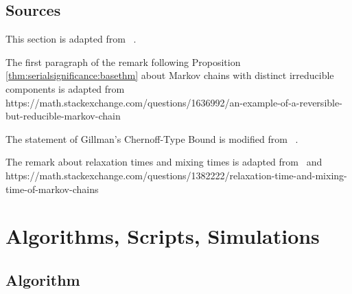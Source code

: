 \documentclass[12pt]{article}
\begin{document}
\subsection*{Sources} This section is adapted from~%
\cite{doi:10.1080/2330443X.2020.1806763, Chikina2860, Chikina2019}.

The first paragraph of the remark following Proposition~%
\ref{thm:serialsignificance:basethm} about Markov chains with distinct
irreducible components is adapted from
https://math.stackexchange.com/questions/1636992/an-example-of-a-reversible-but-reducible-markov-chain

The statement of Gillman's Chernoff-Type Bound is modified from~%
\cite[Theorem 2.1]{gillman98}.

The remark about relaxation times and mixing times is adapted from~%
\cite{levin09} and
https://math.stackexchange.com/questions/1382222/relaxation-time-and-mixing-time-of-markov-chains

\hr

\section*{Algorithms, Scripts, Simulations}

\subsection*{Algorithm}
\end{document}
